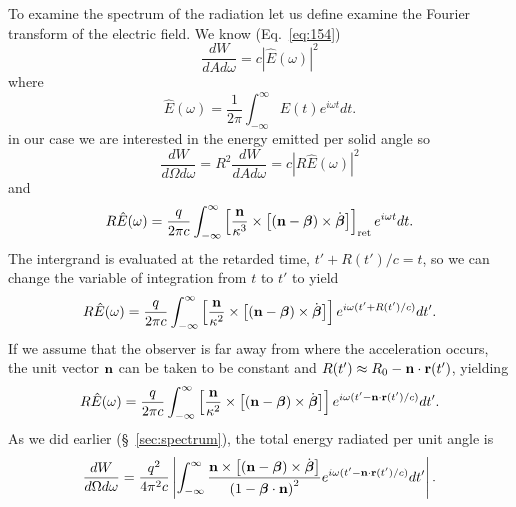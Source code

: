 To examine the spectrum of the radiation let us define examine the
Fourier transform of the electric field.  We know (Eq.~\ref{eq:154})
\begin{equation}
\frac{dW}{dAd\omega} = c |\hat E(\omega)|^2
\label{eq:814}
\end{equation}
where
\begin{equation}
{\hat E} (\omega) = \frac{1}{2\pi} \int_{-\infty}^{\infty} E(t) e^{i\omega t} d t.
\label{eq:816}
\end{equation}
in our case we are interested in the energy emitted per solid angle so
\begin{equation}
\frac{dW}{d\Omega d\omega} = R^2 \frac{dW}{dA d\omega}= c |R \hat E(\omega)|^2
\end{equation}
and
\begin{equation}
R {\hat E} (\omega) = \frac{q}{2\pi c} \int_{-\infty}^{\infty}
\left [ \frac{\bf n}{\kappa^3} \times \left [ 
({\bf n} - \mbox{\boldmath $\beta$} ) \times \dot{\mbox{\boldmath $\beta$}} \right ]\right ]_\mathrm{ret}
e^{i\omega t} d t.
\label{eq:817}
\end{equation}
The intergrand is evaluated at the retarded time, $t'+R(t')/c=t$, so
we can change the variable of integration from $t$ to $t'$ to yield
\begin{equation}
R {\hat E} (\omega) = \frac{q}{2\pi c} \int_{-\infty}^{\infty}
\left [ \frac{\bf n}{\kappa^2} \times \left [ 
({\bf n} - \mbox{\boldmath $\beta$} ) \times \dot{\mbox{\boldmath $\beta$}} \right ]\right ]
e^{i\omega (t'+R(t')/c)} d t'.
\label{eq:818}
\end{equation}
If we assume that the observer is far away from where the acceleration
occurs, the unit vector ${\bf n}$ can be taken to be constant and
$R(t') \approx R_0 - {\bf n} \cdot {\bf r}(t')$, yielding
\begin{equation}
R {\hat E} (\omega) = \frac{q}{2\pi c} \int_{-\infty}^{\infty}
\left [ \frac{\bf n}{\kappa^2} \times \left [ 
({\bf n} - \mbox{\boldmath $\beta$} ) \times \dot{\mbox{\boldmath $\beta$}} \right ]\right ]
e^{i\omega (t'-{\bf n}\cdot {\bf r}(t')/c)} d t'.
\label{eq:819}
\end{equation} 
As we did earlier (\S~\ref{sec:spectrum}), the total energy radiated
per unit angle is
\begin{equation}
\frac{d W}{d\Omega d\omega} =
\frac{q^2}{4\pi^2 c} \left | \int_{-\infty}^{\infty}
\frac{{\bf n} \times \left [  ({\bf n} - \mbox{\boldmath $\beta$} ) \times
    \dot{\mbox{\boldmath $\beta$}} \right ]}{\left ( 1-\mbox{\boldmath $\beta$}\cdot {\bf n} \right )^2}
e^{i\omega (t'-{\bf n}\cdot {\bf r}(t')/c)} d t' \right |.
\label{eq:825}
\end{equation}
